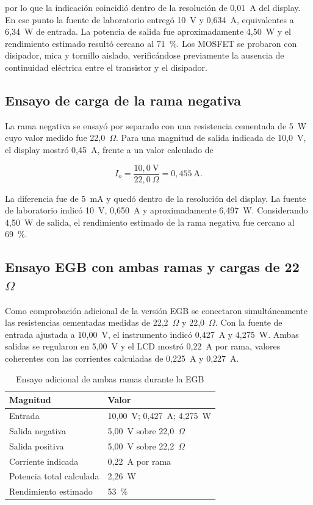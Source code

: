 \documentclass[conference]{IEEEtran}
\begin{document}
por lo que la indicación coincidió dentro de la resolución de 0,01~A del display. En ese punto la fuente de laboratorio entregó 10~V y 0,634~A, equivalentes a 6,34~W de entrada. La potencia de salida fue aproximadamente 4,50~W y el rendimiento estimado resultó cercano al 71~\%. Los MOSFET se probaron con disipador, mica y tornillo aislado, verificándose previamente la ausencia de continuidad eléctrica entre el transistor y el disipador.

\subsection{Ensayo de carga de la rama negativa}

La rama negativa se ensayó por separado con una resistencia cementada de 5~W cuyo valor medido fue 22,0~$\Omega$. Para una magnitud de salida indicada de 10,0~V, el display mostró 0,45~A, frente a un valor calculado de

\begin{equation}
I_o=\frac{10,0\ \mathrm{V}}{22,0\ \Omega}=0,455\ \mathrm{A}.
\end{equation}

La diferencia fue de 5~mA y quedó dentro de la resolución del display. La fuente de laboratorio indicó 10~V, 0,650~A y aproximadamente 6,497~W. Considerando 4,50~W de salida, el rendimiento estimado de la rama negativa fue cercano al 69~\%.

\subsection{Ensayo EGB con ambas ramas y cargas de 22~$\Omega$}

Como comprobación adicional de la versión EGB se conectaron simultáneamente las resistencias cementadas medidas de 22,2~$\Omega$ y 22,0~$\Omega$. Con la fuente de entrada ajustada a 10,00~V, el instrumento indicó 0,427~A y 4,275~W. Ambas salidas se regularon en 5,00~V y el LCD mostró 0,22~A por rama, valores coherentes con las corrientes calculadas de 0,225~A y 0,227~A.

\begin{table}[!t]
\caption{Ensayo adicional de ambas ramas durante la EGB}
\label{tab:rendimiento_egb}
\centering
\footnotesize
\begin{tabular}{@{}ll@{}}
\toprule
\textbf{Magnitud} & \textbf{Valor} \\
\midrule
Entrada & 10,00~V; 0,427~A; 4,275~W \\
Salida negativa & 5,00~V sobre 22,0~$\Omega$ \\
Salida positiva & 5,00~V sobre 22,2~$\Omega$ \\
Corriente indicada & 0,22~A por rama \\
Potencia total calculada & 2,26~W \\
Rendimiento estimado & 53~\% \\
\bottomrule
\end{tabular}
\end{table}
\end{document}
